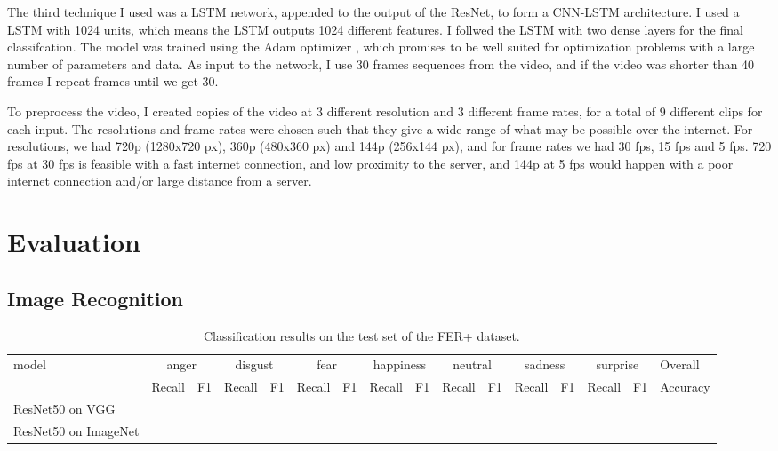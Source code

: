 \documentclass[sigconf]{acmart}
\begin{document}
{The third technique I used was a LSTM network, appended to the output of the
ResNet, to form a CNN-LSTM architecture. I used a LSTM with 1024 units, which
means the LSTM outputs 1024 different features. I follwed the LSTM with two
dense layers for the final classifcation. The model was trained using the Adam
optimizer \cite{kingma2014adam}, which promises to be well suited for
optimization problems with a large number of parameters and data. As input to
the network, I use 30 frames sequences from the video, and if the video was
shorter than 40 frames I repeat frames until we get 30. 

To preprocess the video, I created copies of the video at 3 different
resolution and 3 different frame rates, for a total of 9 different clips for
each input. The resolutions and frame rates were chosen such that they give a
wide range of what may be possible over the internet. For resolutions, we had
720p (1280x720 px), 360p (480x360 px) and 144p (256x144 px), and for
frame rates we had 30 fps, 15 fps and 5 fps. 720 fps at 30 fps is feasible
with a fast internet connection, and low proximity to the server, and 144p at
5 fps would happen with a poor internet connection and/or large distance from
a server. 

\section{Evaluation}

\subsection{Image Recognition}

\begin{table}[]
\caption{Classification results on the test set of the FER+ dataset.}
\begin{tabular}{llllllllllllllll}
\hline
\multirow{2}{*}{model} & \multicolumn{2}{c}{anger} &
\multicolumn{2}{c}{disgust} & \multicolumn{2}{c}{fear} &
\multicolumn{2}{c}{happiness} & \multicolumn{2}{c}{neutral} &
\multicolumn{2}{c}{sadness} & \multicolumn{2}{c}{surprise}  & Overall\\ \cline{2-16}
                       & Recall        & F1        
		       & Recall        & F1        & Recall        & F1
		       &  Recall        & F1        &  Recall        & F1
		       & Recall        & F1        & Recall        & F1    &
		       Accuracy    \\ \hline
ResNet50 on VGG        &               &           &  &  \\
ResNet50 on ImageNet   &               &           &  &  \\
\hline
\end{tabular}
\end{table}


}
\end{document}
